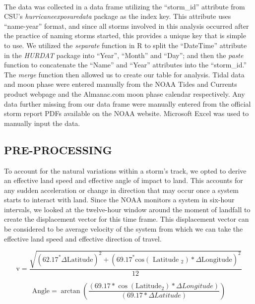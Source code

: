 \documentclass[letterpaper, 10 pt, conference]{ieeeconf}  %
\begin{document}
\\The data was collected in a data frame utilizing the \enquote{storm\_id} attribute from CSU's \textit{hurricaneexposuredata} package as the index key. This attribute uses \enquote{name-year} format, and since all storms involved in this analysis occurred after the practice of naming storms started, this provides a unique key that is simple to use. We utilized the \textit{separate} function in R to split the \enquote{DateTime} attribute in the \textit{HURDAT} package into \enquote{Year}, \enquote{Month} and \enquote{Day}; and then the \textit{paste} function to concatenate the \enquote{Name} and \enquote{Year} attributes into the \enquote{storm\_id.} The \textit{merge} function then allowed us to create our table for analysis. Tidal data and moon phase were entered manually from the NOAA Tides and Currents product webpage and the Almanac.com moon phase calendar respectively. Any data further missing from our data frame were manually entered from the official storm report PDFs available on the NOAA website. Microsoft Excel was used to manually input the data.


\subsection{PRE-PROCESSING}
To account for the natural variations within a storm’s track, we opted to derive an effective land speed and effective angle of impact to land. This accounts for any sudden acceleration or change in direction that may occur once a system starts to interact with land. Since the NOAA monitors a system in six-hour intervals, we looked at the twelve-hour window around the moment of landfall to create the displacement vector for this time frame. This displacement vector can be considered to be average velocity of the system from which we can take the effective land speed and effective direction of travel.

\begin{equation}
{\scriptstyle
\mathrm{v}=\frac{\sqrt{\left(62.17^{*} \Delta \mathrm{Latitude}\right)^{2}+\left(69.17^{*} \mathrm{cos}\left(\text { Latitude }_{2}\right) * \Delta \mathrm{Longitude}\right)^{2}}}{12}
}
\end{equation}

\begin{equation}
{\scriptstyle
\text {Angle}=\arctan \left(\frac{\left(69.17 * \cos \left(\text {Latitude}_{2}\right) * \Delta Longitude\right)}{(69.17 * \Delta Latitude)}\right)
}
\end{equation}
\end{document}
